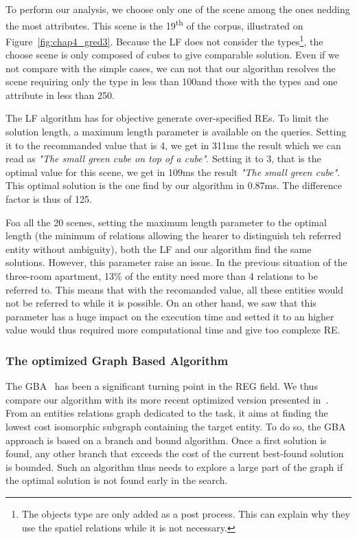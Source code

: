 To perform our analysis, we choose only one of the scene among the ones nedding the most attributes. This scene is the 19\textsuperscript{th} of the corpus, illustrated on Figure~\ref{fig:chap4_gred3}. Because the LF does not consider the types\footnote{The objects type are only added as a post process. This can explain why they use the spatiel relations while it is not necessary.}, the choose scene is only composed of cubes to give comparable solution. Even if we not compare with the simple cases, we can not that our algorithm resolves the scene requiring only the type in less than 100\us and those with the types and one attribute in less than 250\us.

The LF algorithm has for objective generate over-specified REs. To limit the solution length, a maximum length parameter is available on the queries. Setting it to the recommanded value that is 4, we get in 311ms the result which we can read as \textit{"The small green cube on top of a cube"}. Setting it to 3, that is the optimal value for this scene, we get in 109ms the result \textit{"The small green cube"}. This optimal solution is the one find by our algorithm in 0.87ms. The difference factor is thus of 125.

Foa all the 20 scenes, setting the maximum length parameter to the optimal length (the minimum of relations allowing the hearer to distinguish teh referred entity without ambiguity), both the LF and our algorithm find the same solutions. However, this parameter raise an issue. In the previous situation of the three-room apartment, 13\% of the entity need more than 4 relations to be referred to. This means that with the recomanded value, all these entities would not be referred to while it is possible. On an other hand, we saw that this parameter has a huge impact on the execution time and setted it to an higher value would thus required more computational time and give too complexe RE.

\subsubsection{The optimized Graph Based Algorithm}

The GBA~\cite{viethen_2013_graphs} has been a significant turning point in the REG field. We thus compare our algorithm with its more recent optimized version presented in~\cite{li_2017_automatically}. From an entities relations graph dedicated to the task, it aims at finding the lowest cost isomorphic subgraph containing the target entity. To do so, the GBA approach is based on a branch and bound algorithm. Once a first solution is found, any other branch that exceeds the cost of the current best-found solution is bounded. Such an algorithm thus needs to explore a large part of the graph if the optimal solution is not found early in the search.

